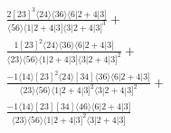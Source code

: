 \documentclass[varwidth, border=5pt]{standalone}
\begin{document}
\begin{my}
$\begin{gathered}
\scriptscriptstyle\frac{2[23]^3⟨24⟩⟨36⟩⟨6|2+4|3]}{⟨56⟩⟨1|2+4|3]⟨3|2+4|3]^3}+\\
\scriptscriptstyle\frac{1[23]^2⟨24⟩⟨36⟩⟨6|2+4|3]}{⟨23⟩⟨56⟩⟨1|2+4|3]⟨3|2+4|3]^2}+\\
\scriptscriptstyle\frac{-1⟨14⟩[23]^2⟨24⟩[34]⟨36⟩⟨6|2+4|3]}{⟨23⟩⟨56⟩⟨1|2+4|3]^2⟨3|2+4|3]^2}+\\
\scriptscriptstyle\frac{-1⟨14⟩[23][34]⟨46⟩⟨6|2+4|3]}{⟨23⟩⟨56⟩⟨1|2+4|3]^2⟨3|2+4|3]}\phantom{+}
\end{gathered}$
\end{my}
\end{document}
